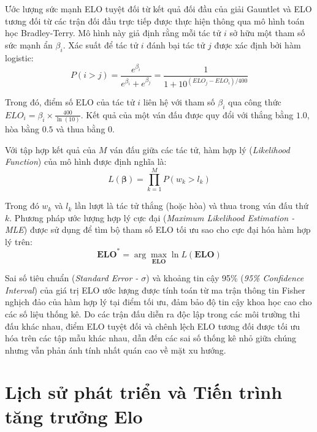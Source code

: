 Ước lượng sức mạnh ELO tuyệt đối từ kết quả đối đầu của giải Gauntlet và ELO tương đối từ các trận đối đầu trực tiếp được thực hiện thông qua mô hình toán học Bradley-Terry. Mô hình này giả định rằng mỗi tác tử $i$ sở hữu một tham số sức mạnh ẩn $\beta_i$. Xác suất để tác tử $i$ đánh bại tác tử $j$ được xác định bởi hàm logistic:
\[ P(i > j) = \frac{e^{\beta_i}}{e^{\beta_i} + e^{\beta_j}} = \frac{1}{1 + 10^{(ELO_j - ELO_i)/400}} \]

Trong đó, điểm số ELO của tác tử $i$ liên hệ với tham số $\beta_i$ qua công thức $ELO_i = \beta_i \times \frac{400}{\ln(10)}$. Kết quả của một ván đấu được quy đổi với thắng bằng $1.0$, hòa bằng $0.5$ và thua bằng $0$.

Với tập hợp kết quả của $M$ ván đấu giữa các tác tử, hàm hợp lý (\textit{Likelihood Function}) của mô hình được định nghĩa là:
\[ L(\boldsymbol{\beta}) = \prod_{k=1}^{M} P(w_k > l_k) \]

Trong đó $w_k$ và $l_k$ lần lượt là tác tử thắng (hoặc hòa) và thua trong ván đấu thứ $k$. Phương pháp ước lượng hợp lý cực đại (\textit{Maximum Likelihood Estimation - MLE}) được sử dụng để tìm bộ tham số ELO tối ưu sao cho cực đại hóa hàm hợp lý trên:
\[ \boldsymbol{ELO}^* = \arg\max_{\boldsymbol{ELO}} \ln L(\boldsymbol{ELO}) \]

Sai số tiêu chuẩn (\textit{Standard Error - $\sigma$}) và khoảng tin cậy 95\% (\textit{95\% Confidence Interval}) của giá trị ELO ước lượng được tính toán từ ma trận thông tin Fisher nghịch đảo của hàm hợp lý tại điểm tối ưu, đảm bảo độ tin cậy khoa học cao cho các số liệu thống kê. Do các trận đấu diễn ra độc lập trong các môi trường thi đấu khác nhau, điểm ELO tuyệt đối và chênh lệch ELO tương đối được tối ưu hóa trên các tập mẫu khác nhau, dẫn đến các sai số thống kê nhỏ giữa chúng nhưng vẫn phản ánh tính nhất quán cao về mặt xu hướng.

\section{Lịch sử phát triển và Tiến trình tăng trưởng Elo}

